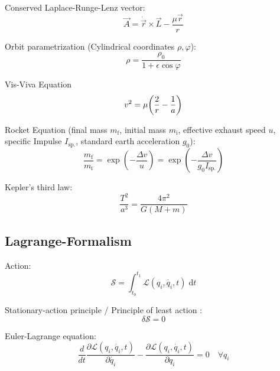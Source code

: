		\noindent
		Conserved Laplace-Runge-Lenz vector:
		\begin{equation}
			\vec{A} = \dot{\vec{r}}\times\vec{L} - \frac{\mu \vec{r}}{r}
		\end{equation}

		\noindent
		Orbit parametrization (Cylindrical coordinates $\rho, \varphi$):
		\begin{equation}
			\rho = \frac{\rho_0}{1+\epsilon \cos\varphi}
		\end{equation}

		\noindent
		Vis-Viva Equation
		\begin{equation}
			v^2 = \mu\qty(\frac{2}{r} - \frac{1}{a})
		\end{equation}

		\noindent
		Rocket Equation (final mass $m_\text{f}$, initial mass $m_\text{i}$, effective exhaust speed $u$, specific Impulse $I_{\text{sp.}}$, standard earth acceleration $g_0$):
		\begin{equation}
			\frac{m_\text{f}}{m_\text{i}} = \exp(-\frac{\Delta v}{u}) = \exp(-\frac{\Delta v}{g_0 I_{\text{sp.}}})
		\end{equation}

		\noindent
		Kepler's third law:
		\begin{equation}
			\frac{T^2}{a^3} = \frac{4\pi^2}{G(M+m)}
		\end{equation}

	\subsection{Lagrange-Formalism}
		\noindent
		Action:
		\begin{equation}
			\mathcal{S}=\int_{t_0}^{t_1}\mathcal{L}(q_i, \dot{q_i},t)\;\mathrm{d} t
		\end{equation}

		\noindent
		Stationary-action principle / Principle of least action :
		\begin{equation}
			\delta \mathcal{S}=0
		\end{equation}

		\noindent
		Euler-Lagrange equation:
		\begin{equation}
			\frac{d}{dt} \frac{\partial \mathcal{L}(q_{i},\dot{q_{i}},t)}{\partial \dot{q_{i}}} - \frac{\partial \mathcal{L}(q_{i},\dot{q_{i}},t)}{\partial q_{i}} = 0 \quad \forall q_i
		\end{equation}

